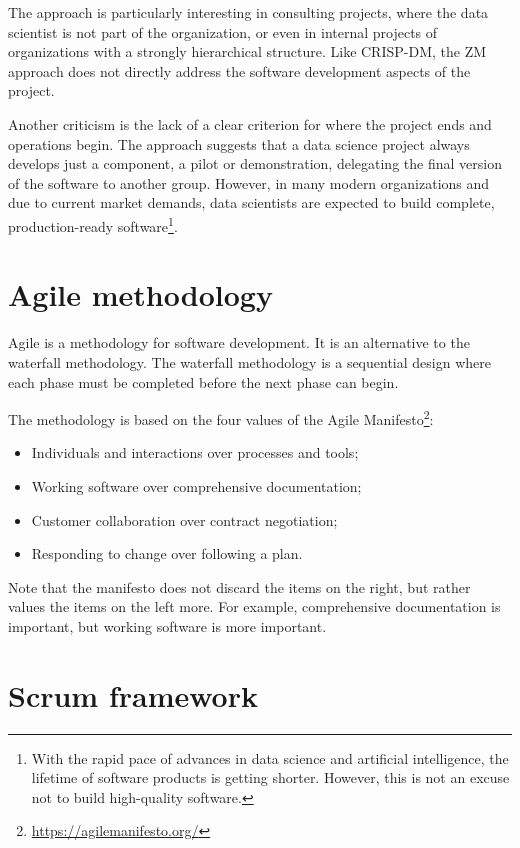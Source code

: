 The approach is particularly interesting in consulting projects, where the data scientist
is not part of the organization, or even in internal projects of organizations with a
strongly hierarchical structure.  Like CRISP-DM, the ZM approach does not directly address
the software development aspects of the project.

Another criticism is the lack of a clear criterion for where the project ends and
operations begin.  The approach suggests that a data science project always develops just
a component, a pilot or demonstration, delegating the final version of the software to
another group.  However, in many modern organizations and due to current market demands,
data scientists are expected to build complete, production-ready software\footnote{With
the rapid pace of advances in data science and artificial intelligence, the
lifetime of software products is getting shorter.  However, this is not an excuse
not to build high-quality software.}.

\section{Agile methodology}

Agile is a methodology for software development.  It is an alternative to the waterfall
methodology.  The waterfall methodology is a sequential design where each phase
must be completed before the next phase can begin.

The methodology is based on the four values of the Agile Manifesto\footnote{\url{https://agilemanifesto.org/}}:
\begin{itemize}
  \itemsep0em
  \item Individuals and interactions over processes and tools;
  \item Working software over comprehensive documentation;
  \item Customer collaboration over contract negotiation;
  \item Responding to change over following a plan.
\end{itemize}

Note that the manifesto does not discard the items on the right, but rather values the items on
the left more.  For example, comprehensive documentation is important, but working software
is more important.

\section{Scrum framework}

